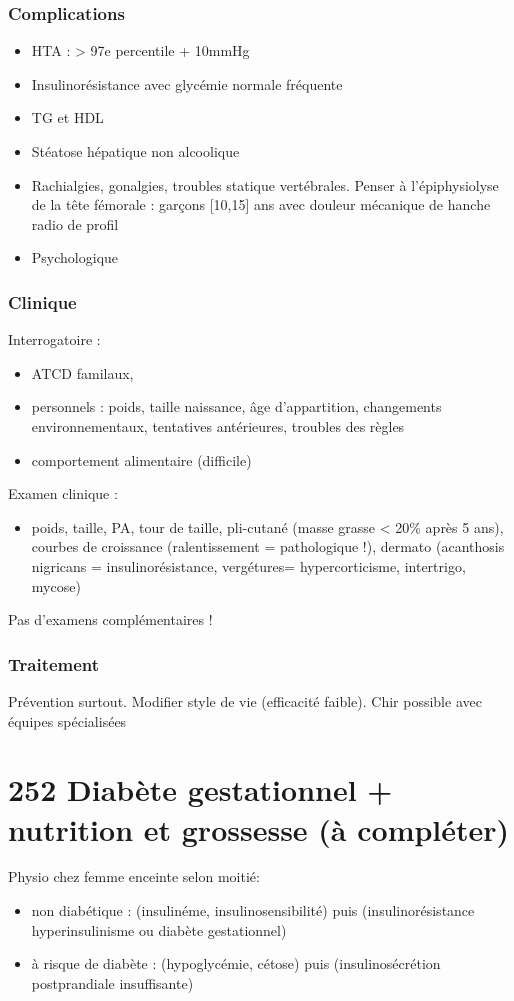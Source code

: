 \documentclass{book}
\begin{document}
\subsubsection{Complications}
\label{sec:org5e7c1b3}
\begin{itemize}
\item HTA : > 97e percentile + 10mmHg
\item Insulinorésistance avec glycémie normale fréquente
\item \inc TG et \dec HDL
\item Stéatose hépatique non alcoolique
\item Rachialgies, gonalgies, troubles statique vertébrales. Penser à l'épiphysiolyse
de la tête fémorale : garçons [10,15] ans avec douleur mécanique de hanche
\thus radio de profil
\item Psychologique
\end{itemize}

\subsubsection{Clinique}
\label{sec:orgedb6b04}
Interrogatoire : 
\begin{itemize}
\item ATCD familaux,
\item personnels : poids, taille naissance, âge d'appartition, changements environnementaux, tentatives antérieures, troubles des règles
\item comportement alimentaire (difficile)
\end{itemize}
Examen clinique :
\begin{itemize}
\item poids, taille, PA, tour de taille, pli-cutané (masse grasse < 20\% après 5 ans), courbes de
croissance (ralentissement = pathologique !), dermato (acanthosis nigricans =
insulinorésistance, vergétures= hypercorticisme, intertrigo, mycose)
\end{itemize}
Pas d'examens complémentaires !

\subsubsection{Traitement}
\label{sec:org719a93f}
Prévention surtout. Modifier style de vie (efficacité faible). Chir possible
avec équipes spécialisées
\section{252 \textdagger{} Diabète gestationnel + nutrition et grossesse (à compléter)}
\label{sec:org3d97896}
\label{orgea40854}
 Physio chez femme enceinte selon moitié:
\begin{itemize}
\item non diabétique : (\inc insulinéme, insulinosensibilité) puis (insulinorésistance
\thus hyperinsulinisme ou diabète gestationnel)
\item à risque de diabète : (hypoglycémie, cétose) puis (insulinosécrétion
postprandiale insuffisante)
\end{itemize}
\end{document}
